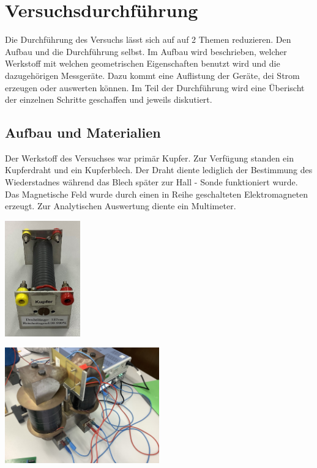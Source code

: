 \section{Versuchsdurchführung} 
\label{sec:versuchdurchführung}
Die Durchführung des Versuchs lässt sich auf auf 2 Themen reduzieren. Den Aufbau %
und die Durchführung %
selbst. Im Aufbau wird beschrieben, 
welcher Werkstoff mit welchen geometrischen Eigenschaften benutzt wird und die dazugehörigen Messgeräte. Dazu kommt eine Auflistung der  Geräte, dei Strom erzeugen oder 
auswerten können. Im Teil der Durchführung %
wird eine Überischt der einzelnen Schritte geschaffen und jeweils diskutiert.


\subsection{Aufbau und Materialien}
\label{sec:Aufbau}
Der Werkstoff des Versuchses war primär Kupfer. Zur Verfügung standen ein Kupferdraht und ein Kupferblech. Der Draht diente lediglich der Bestimmung des Wiederstadnes während 
das Blech später zur Hall - Sonde funktioniert wurde. 
Das Magnetische Feld wurde durch einen in Reihe geschalteten Elektromagneten erzeugt. Zur Analytischen Auswertung diente ein Multimeter.\\

\vspace{1cm}
\begin{minipage}{0.5\textwidth}
\centering
\includegraphics[height=5cm]{bilder/Kupferdraht.png}
\label{fig:Kupferdraht}
\end{minipage}
\hfill
\begin{minipage}{0.49\textwidth} 
\centering
\includegraphics[height=5cm]{bilder/Magnet.png}
\label{fig:Magnet}
\end{minipage}

